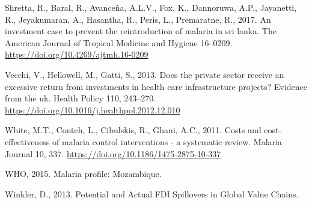 \documentclass[]{article}
\begin{document}
\hypertarget{ref-Shretta_2017}{}
Shretta, R., Baral, R., Avanceña, A.L.V., Fox, K., Dannoruwa, A.P.,
Jayanetti, R., Jeyakumaran, A., Hasantha, R., Peris, L., Premaratne, R.,
2017. An investment case to prevent the reintroduction of malaria in sri
lanka. The American Journal of Tropical Medicine and Hygiene 16--0209.
\url{https://doi.org/10.4269/ajtmh.16-0209}

\hypertarget{ref-Vecchi_2013}{}
Vecchi, V., Hellowell, M., Gatti, S., 2013. Does the private sector
receive an excessive return from investments in health care
infrastructure projects? Evidence from the uk. Health Policy 110,
243--270. \url{https://doi.org/10.1016/j.healthpol.2012.12.010}

\hypertarget{ref-White_2011}{}
White, M.T., Conteh, L., Cibulskis, R., Ghani, A.C., 2011. Costs and
cost-effectiveness of malaria control interventions - a systematic
review. Malaria Journal 10, 337.
\url{https://doi.org/10.1186/1475-2875-10-337}

\hypertarget{ref-whoprof}{}
WHO, 2015. Malaria profile: Mozambique.

\hypertarget{ref-Winkler}{}
Winkler, D., 2013. Potential and Actual FDI Spillovers in Global Value
Chains.
\end{document}

